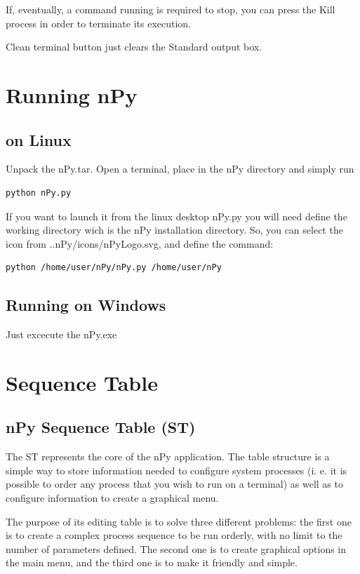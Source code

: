 \documentclass[a4paper,10pt]{article}
\begin{document}
If, eventually, a command running is required to stop, you can press the Kill process in order to terminate its execution.

Clean terminal button just clears the Standard output box.

\section{Running nPy}

\subsection{on Linux}

Unpack the nPy.tar. Open a terminal, place in the nPy directory and simply run

\begin{verbatim}
python nPy.py 
\end{verbatim}

If you want to launch it from the linux desktop nPy.py you will need define the working directory wich is the nPy installation directory. So, you can select the icon from ..nPy/icons/nPyLogo.svg, and define the command:

\begin{verbatim}
python /home/user/nPy/nPy.py /home/user/nPy
\end{verbatim}

\subsection{Running on Windows}

Just excecute the nPy.exe

\section{Sequence Table}

\subsection{nPy Sequence Table (ST)}

The ST represents the core of the nPy application. The table structure is a simple way to store information needed to configure system processes (i. e.  it is possible to order any process that you wish to run on a terminal) as well as to configure information to create a graphical menu.

The purpose of its editing table is to solve three different problems: the first one is to create a complex process sequence to be run orderly, with no limit to the number of parameters defined. The second one is to create graphical options in the main menu, and the third one is to make it friendly and simple.
\end{document}
